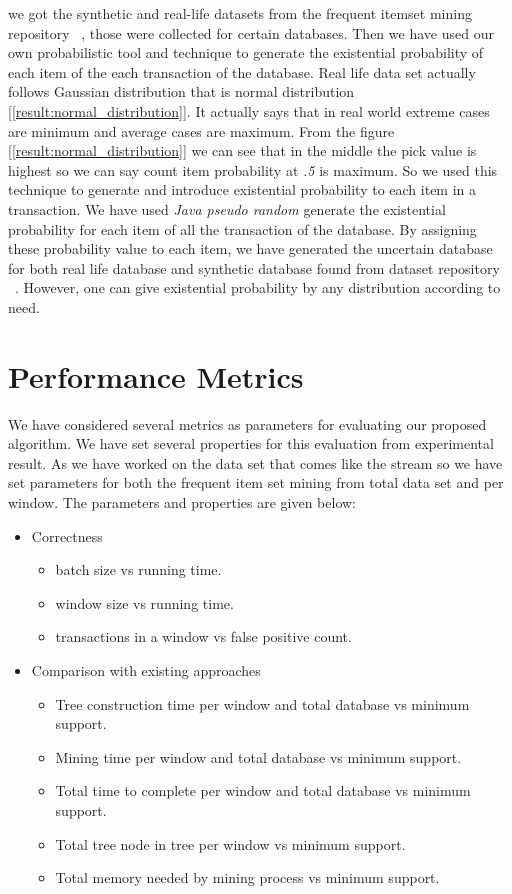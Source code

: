 
we got the synthetic and real-life datasets from the frequent itemset mining repository ~\cite{dataset}, those were collected for certain databases. Then we have used our own probabilistic tool and technique to generate the existential probability of each item of the each transaction of the database. Real life data set actually follows Gaussian distribution that is normal distribution [\ref{result:normal_distribution}]. It actually says that in real world extreme cases are minimum and average cases are maximum. From the figure [\ref{result:normal_distribution}] we can see that in the middle the pick value is highest so we can say count item probability at \emph{.5} is maximum. So we used this technique to generate and introduce existential probability to each item in a transaction. We have used \emph{Java pseudo random} generate the existential probability for each item of all the transaction of the database. By assigning these probability value to each item, we have generated the uncertain database for both real life database and synthetic database found from dataset repository ~\cite{dataset}. However, one can give existential probability by any distribution according to need.


\section{Performance Metrics}
We have considered several metrics as parameters for evaluating our proposed algorithm. We have set several properties for this evaluation from experimental result. As we have worked on the data set that comes like the stream so we have set parameters for both the frequent item set mining from total data set and per window. The parameters and properties are given below:

\begin{itemize}
    \item {Correctness}
    \begin{itemize}
        \item batch size vs running time.
        \item window size vs running time.
        \item transactions in a window vs false positive count.
    \end{itemize}
    \item {Comparison with existing approaches}
    \begin{itemize}
        \item Tree construction time per window and total database vs minimum support.
        \item Mining time per window and total database vs minimum support.
        \item Total time to complete per window and total database vs minimum support.
        \item Total tree node in tree per window vs minimum support.
        \item Total memory needed by mining process vs minimum support.
    \end{itemize}
\end{itemize}
